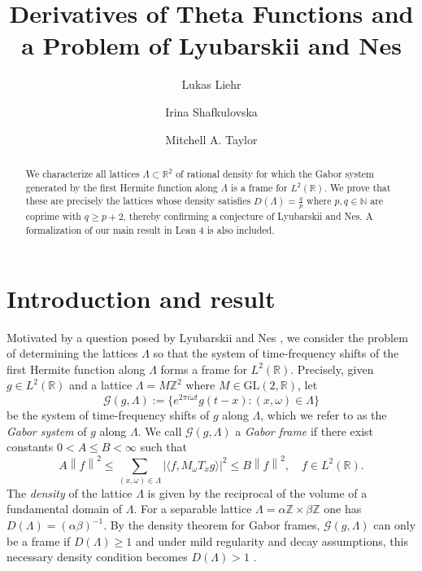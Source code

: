 \documentclass[reqno,a4paper,12pt]{amsart}
\title[Derivatives of Theta Functions and a Problem of Lyubarskii and Nes]{Derivatives of Theta Functions and a Problem of Lyubarskii and Nes}
\author[Lukas Liehr]{Lukas Liehr}
\author[Irina Shafkulovska]{Irina Shafkulovska}
\author[Mitchell A. Taylor]{Mitchell A. Taylor}
\numberwithin{equation}{section}
\newcommand{\N}{\mathbb N}
\newcommand{\Z}{\mathbb Z}
\newcommand{\R}{\mathbb R}
\newcommand{\calG}{\mathcal G}
\newcommand{\norm}[1]{\left\lVert #1 \right\rVert}
\begin{document}
\begin{abstract}
We characterize all lattices $\Lambda \subset \R^2$ of rational density for which the Gabor system generated by the first Hermite function along $\Lambda$ is a frame for $L^2(\R)$. We prove that these are precisely the lattices whose density satisfies $D(\Lambda) = \frac q p $ where $p,q \in \N$ are coprime with $q \geq p+2$, thereby confirming a conjecture of Lyubarskii and Nes. A formalization of our main result in Lean $4$ is also included.
\end{abstract}


\maketitle


\section{Introduction and result}

Motivated by a question posed by Lyubarskii and Nes \cite{lyubarskii2013gabor}, we consider the problem of determining the lattices $\Lambda$ so that the system of time-frequency shifts of the first Hermite function along $\Lambda$ forms a frame for $L^2(\R)$. Precisely, given $g\in L^2(\R)$ and a lattice $\Lambda = M\Z^2$ where $M\in\mathrm{GL}(2,\R)$, let
$$
\calG(g,\Lambda) :=\{e^{2\pi i \omega t} g(t-x) : (x,\omega)\in\Lambda\}
$$
be the system of time-frequency shifts of $g$ along $\Lambda$, which we refer to as the  \emph{Gabor system} of $g$ along $\Lambda$. We call $\calG(g,\Lambda)$ a \emph{Gabor frame} if there exist constants $0<A\leq B<\infty$ such that
\begin{equation}\label{eq:def:frame}
    A\norm{f}^2
\leq
\sum_{(x,\omega)\in\Lambda} |\langle f,M_{\omega}T_{x} g\rangle|^2 \leq
B\norm{f}^2,\quad f\in L^2(\R).
\end{equation}
The \emph{density} of the lattice $\Lambda$ is given by the reciprocal of the volume of a fundamental domain of $\Lambda$. For a separable lattice $\Lambda = \alpha\Z\times\beta\Z$ one has $D(\Lambda) = (\alpha\beta)^{-1}$. By the density theorem for Gabor frames, $\calG(g,\Lambda)$ can only be a frame if $D(\Lambda)\geq 1$ \cite{Heil2007,GroechenigKoppensteiner2019} and under mild regularity and decay assumptions, this necessary density condition becomes $D(\Lambda) > 1$ \cite{Balian1981,Low1985}.
\end{document}
